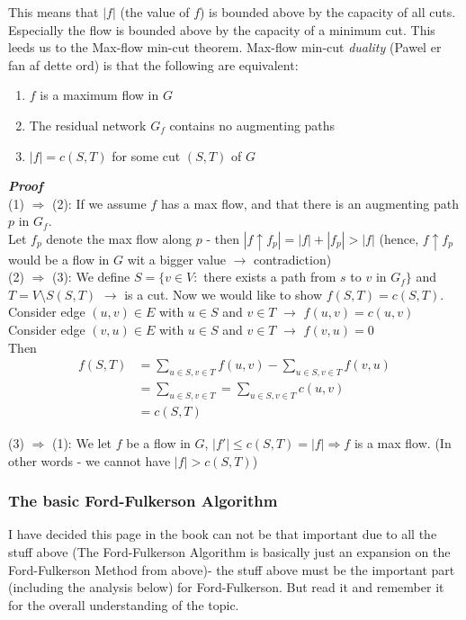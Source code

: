 \documentclass[12pt]{article}
\begin{document}
This means that $|f|$ (the value of $f$) is bounded above by the capacity of all cuts. Especially the flow is bounded above by the capacity of a minimum cut. This leeds us to the Max-flow min-cut theorem. Max-flow min-cut \textit{duality} (Pawel er fan af dette ord) is that the following are equivalent:

\begin{enumerate}
	\item $f$ is a maximum flow in $G$
	\item The residual network $G_f$ contains no augmenting paths 
	\item $|f| = c(S, T)$ for some cut $(S, T)$ of $G$
\end{enumerate}

\textbf{\textit{Proof}}\\
(1) $\Rightarrow$ (2): If we assume $f$ has a max flow, and that there is an augmenting path $p$ in $G_f$. \\
Let $f_p$ denote the max flow along $p$ - then $|f \uparrow f_p| = |f| + |f_p| > |f|$ (hence, $f \uparrow f_p$ would be a flow in $G$ wit a bigger value $\rightarrow$ contradiction)\\

(2) $\Rightarrow$ (3): We define $S = \{v \in V :$ there exists a path from $s$ to $v$ in $G_f\}$ and $T = V\setminus S (S, T)$ $\rightarrow$ is a cut. Now we would like to show $f(S, T) = c(S, T)$. \\

Consider edge $(u, v) \in E$ with $u\in S$ and $v \in T$ $\rightarrow$ $f(u, v) = c(u, v)$\\
Consider edge $(v, u) \in E$ with $u\in S$ and $v \in T$ $\rightarrow$ $f(v, u) = 0$\\

Then \begin{align*}
f(S, T) &= \sum_{u \in S, v \in T} f(u, v) - \sum_{u \in S, v \in T} f(v, u)\\
&= \sum_{u \in S, v \in T} = \sum_{u \in S, v \in T} c(u, v)\\
&= c(S, T)
\end{align*}

(3) $\Rightarrow$ (1): We let $f$ be a flow in $G$, $|f'| \leq c(S, T) = |f| \Rightarrow f$ is a max flow. (In other words - we cannot have $|f| > c(S, T)$)
%
\subsubsection{The basic Ford-Fulkerson Algorithm}
I have decided this page in the book can not be that important due to all the stuff above (The Ford-Fulkerson Algorithm is basically just an expansion on the Ford-Fulkerson Method from above)- the stuff above must be the important part (including the analysis below) for Ford-Fulkerson. But read it and remember it for the overall understanding of the topic. 
%
\end{document}
